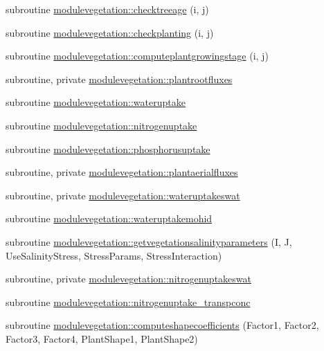 \begin{DoxyCompactItemize}
\item 
subroutine \mbox{\hyperlink{namespacemodulevegetation_adc2f366c1b31fc9c591f3d3be221f677}{modulevegetation\+::checktreeage}} (i, j)
\item 
subroutine \mbox{\hyperlink{namespacemodulevegetation_a51a465c0efb7efd6bb8d99cabfc0c19e}{modulevegetation\+::checkplanting}} (i, j)
\item 
subroutine \mbox{\hyperlink{namespacemodulevegetation_a57fef770d6b519b24b11d4ce771e5c20}{modulevegetation\+::computeplantgrowingstage}} (i, j)
\item 
subroutine, private \mbox{\hyperlink{namespacemodulevegetation_abcc76339f35e9a70675847ad459a843c}{modulevegetation\+::plantrootfluxes}}
\item 
subroutine \mbox{\hyperlink{namespacemodulevegetation_a8970a84682188f12c5a7e3c69fdbc853}{modulevegetation\+::wateruptake}}
\item 
subroutine \mbox{\hyperlink{namespacemodulevegetation_a61c5cc19d5b5fe894bc935b7365563cb}{modulevegetation\+::nitrogenuptake}}
\item 
subroutine \mbox{\hyperlink{namespacemodulevegetation_a8ecdc6f2c513a0f8920f448525858005}{modulevegetation\+::phosphorusuptake}}
\item 
subroutine, private \mbox{\hyperlink{namespacemodulevegetation_a99cb73f235c051753d3cc48f59f56eae}{modulevegetation\+::plantaerialfluxes}}
\item 
subroutine, private \mbox{\hyperlink{namespacemodulevegetation_abf633925bf9ba7db34dd3d63300fe43d}{modulevegetation\+::wateruptakeswat}}
\item 
subroutine \mbox{\hyperlink{namespacemodulevegetation_ac76c877ab32f2ff96b234d3ba23b4dbc}{modulevegetation\+::wateruptakemohid}}
\item 
subroutine \mbox{\hyperlink{namespacemodulevegetation_aede0fbef50c854f21b7dc76d3534b847}{modulevegetation\+::getvegetationsalinityparameters}} (I, J, Use\+Salinity\+Stress, Stress\+Params, Stress\+Interaction)
\item 
subroutine, private \mbox{\hyperlink{namespacemodulevegetation_a5c30bda27fd79a69f45cc6fd35a2f0af}{modulevegetation\+::nitrogenuptakeswat}}
\item 
subroutine \mbox{\hyperlink{namespacemodulevegetation_a1a53d3932ef020aaa3e0656050c15ee3}{modulevegetation\+::nitrogenuptake\+\_\+transpconc}}
\item 
subroutine \mbox{\hyperlink{namespacemodulevegetation_a977606da8238f3bcf3eeedafa42a6582}{modulevegetation\+::computeshapecoefficients}} (Factor1, Factor2, Factor3, Factor4, Plant\+Shape1, Plant\+Shape2)

\end{DoxyCompactItemize}
